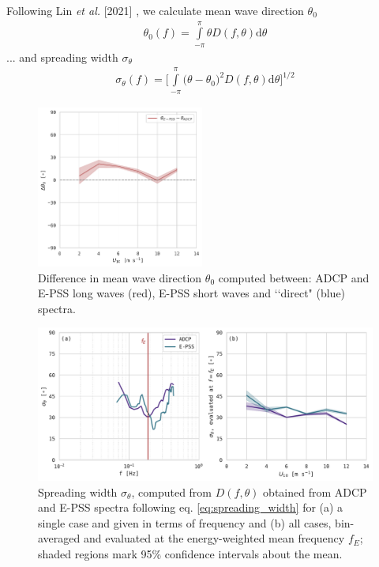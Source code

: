 \documentclass[letterpaper,journal]{IEEEtran}
\begin{document}
\newpage

Following Lin \emph{et al.} [2021] \cite{lin_estimating_2022}, we calculate mean wave direction $\theta_0$
\begin{align}
    \theta_0(f)=\int\limits_{-\pi}^{\pi}\theta D(f,\theta)\mathrm{d}\theta
    \label{eq:mean_wave_direction}
\end{align}
... and spreading width $\sigma_\theta$
\begin{align}
    \sigma_\theta(f)=\Bigg[\int\limits_{-\pi}^{\pi}\big(\theta-\theta_0\big)^2 D(f,\theta)\mathrm{d}\theta\Bigg]^{1/2}
\label{eq:spreading_width}
\end{align}

\vspace{-20pt}

\begin{figure}[!ht]
    \centering
    \includegraphics[width=0.49\textwidth]{_figures/delta_theta_nought.pdf}
    \caption{Difference in mean wave direction $\theta_0$ computed between: ADCP and E-PSS long waves (red), E-PSS short waves and \lq\lq direct" (blue) spectra.}
    \label{fig:delta_theta_nought}
\end{figure}

\begin{figure}[!hb]
    \centering
    \includegraphics[width=\textwidth]{_figures/directional_spreading_comparison.pdf}
    \vspace{-20pt}
\caption{Spreading width $\sigma_\theta$, computed from $D(f,\theta)$ obtained from ADCP and E-PSS spectra following eq. \ref{eq:spreading_width} for (a) a single case and given in terms of frequency and (b) all cases, bin-averaged and evaluated at the energy-weighted mean frequency $f_E$; shaded regions mark 95\% confidence intervals about the mean.}
\label{fig:directional_spreading_comparison}
\end{figure}
\end{document}
